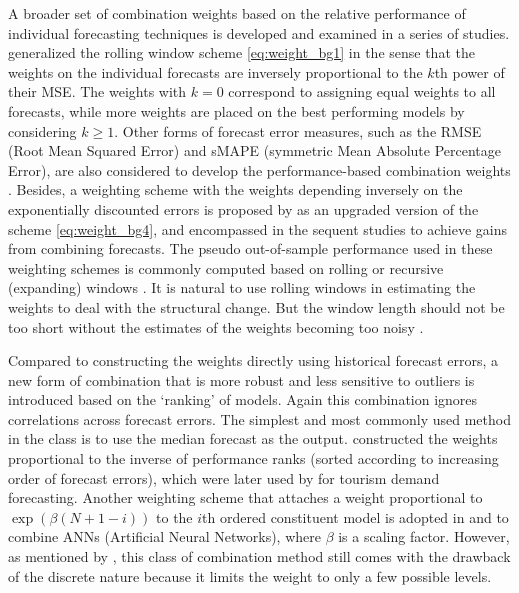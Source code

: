 \documentclass[11pt]{article}
\begin{document}
A broader set of combination weights based on the relative performance of individual forecasting techniques is developed and examined in a series of studies. \cite{Stock1998-np} generalized the rolling window scheme \eqref{eq:weight_bg1} in the sense that the weights on the individual forecasts are inversely proportional to the $k$th power of their MSE. The weights with $k=0$ correspond to assigning equal weights to all forecasts, while more weights are placed on the best performing models by considering $k \geq 1$. Other forms of forecast error measures, such as the RMSE (Root Mean Squared Error) and sMAPE (symmetric Mean Absolute Percentage Error), are also considered to develop the performance-based combination weights \citep[e.g.,][]{Nowotarski2014-ev,Pawlikowski2020-hm}. Besides, a weighting scheme with the weights depending inversely on the exponentially discounted errors is proposed by \cite{Stock2004-rq} as an upgraded version of the scheme \eqref{eq:weight_bg4}, and encompassed in the sequent studies \citep[e.g.,][]{Clark2010-jx,Genre2013-ut} to achieve gains from combining forecasts. The pseudo out-of-sample performance used in these weighting schemes is commonly computed based on rolling or recursive (expanding) windows \citep[e.g.,][]{Stock1998-np,Clark2010-jx,Genre2013-ut}. It is natural to use rolling windows in estimating the weights to deal with the structural change. But the window length should not be too short without the estimates of the weights becoming too noisy \citep{Baumeister2015-ft}.

Compared to constructing the weights directly using historical forecast errors, a new form of combination that is more robust and less sensitive to outliers is introduced based on the `ranking' of models. Again this combination ignores correlations across forecast errors. The simplest and most commonly used method in the class is to use the median forecast as the output. \cite{Aiolfi2006-rh} constructed the weights proportional to the inverse of performance ranks (sorted according to increasing order of forecast errors), which were later used by \cite{Andrawis2011-kb} for tourism demand forecasting. Another weighting scheme that attaches a weight proportional to $\exp (\beta(N+1-i))$ to the $i$th ordered constituent model is adopted in \cite{Yao2008-or} and \cite{Donate2013-lq} to combine ANNs (Artificial Neural Networks), where $\beta$ is a scaling factor. However, as mentioned by \cite{Andrawis2011-kb}, this class of combination method still comes with the drawback of the discrete nature because it limits the weight to only a few possible levels.
\end{document}
